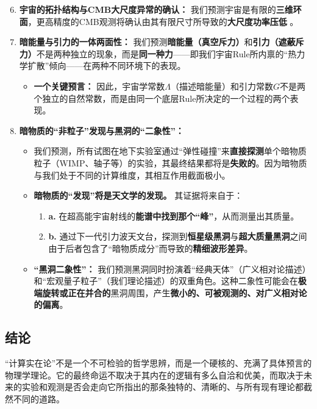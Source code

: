 \documentclass[11pt, a4paper]{article}
\begin{document}
\begin{enumerate}
    \setcounter{enumi}{5} %
    \item \textbf{宇宙的拓扑结构与CMB大尺度异常的确认：}
    我们预测宇宙是有限的\textbf{三维环面}，更高精度的CMB观测将确认由其有限尺寸所导致的\textbf{大尺度功率压低} \cite{Planck2020}。

    \item \textbf{暗能量与引力的一体两面性：}
    我们预测\textbf{暗能量（真空斥力）}和\textbf{引力（遮蔽斥力）}不是两种独立的现象，而是\textbf{同一种力}——即我们宇宙Rule所内禀的“热力学扩散”倾向——在两种不同环境下的表现。
    \begin{itemize}
        \item \textbf{一个关键预言：} 因此，宇宙学常数$\Lambda$（描述暗能量）和引力常数$G$不是两个独立的自然常数，而是由同一个底层Rule所决定的一个过程的两个表现。
    \end{itemize}

    \item \textbf{暗物质的“非粒子”发现与黑洞的“二象性”：}
    \begin{itemize}
        \item 我们预测，所有试图在地下实验室通过“弹性碰撞”来\textbf{直接探测}单个暗物质粒子（WIMP、轴子等）的实验，其最终结果都将是\textbf{失败的}。因为暗物质与我们处于不同的计算维度，其相互作用截面极小。
        \item \textbf{暗物质的“发现”将是天文学的发现。} 其证据将来自于：
        \begin{enumerate}
            \item \textbf{a.} 在超高能宇宙射线的\textbf{能谱中找到那个“峰”}，从而测量出其质量。
            \item \textbf{b.} 通过下一代引力波天文台，探测到\textbf{恒星级黑洞}与\textbf{超大质量黑洞}之间由于后者包含了“暗物质成分”而导致的\textbf{精细波形差异}。
        \end{enumerate}
        \item \textbf{“黑洞二象性”：} 我们预测黑洞同时扮演着“经典天体”（广义相对论描述）和“宏观量子粒子”（我们理论描述）的双重角色。这种二象性可能会在\textbf{极端旋转或正在并合的}黑洞周围，产生\textbf{微小的、可被观测的、对广义相对论的偏离}。
    \end{itemize}
\end{enumerate}


\subsection*{结论}
“计算实在论”不是一个不可检验的哲学思辨，而是一个硬核的、充满了具体预言的物理学理论。它的最终命运不取决于其内在的逻辑有多么自洽和优美，而取决于未来的实验和观测是否会走向它所指出的那条独特的、清晰的、与所有现有理论都截然不同的道路。
\end{document}
